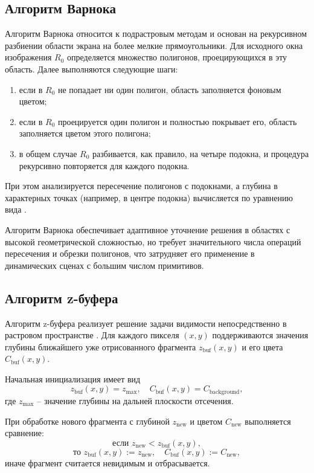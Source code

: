 \subsection{Алгоритм Варнока}

Алгоритм Варнока относится к подрастровым методам и основан на рекурсивном разбиении области экрана на более мелкие прямоугольники.\cite{FoleyVanDam} Для исходного окна изображения $R_{0}$ определяется множество полигонов, проецирующихся в эту область. Далее выполняются следующие шаги:
\begin{enumerate}
	\item если в $R_{0}$ не попадает ни один полигон, область заполняется фоновым цветом;
	\item если в $R_{0}$ проецируется один полигон и полностью покрывает его, область заполняется цветом этого полигона;
	\item в общем случае $R_{0}$ разбивается, как правило, на четыре подокна, и процедура рекурсивно повторяется для каждого подокна.
\end{enumerate}

При этом анализируется пересечение полигонов с подокнами, а глубина в характерных точках (например, в центре подокна) вычисляется по уравнению вида \cite{RogersAdams}.

Алгоритм Варнока обеспечивает адаптивное уточнение решения в областях с высокой геометрической сложностью, но требует значительного числа операций пересечения и обрезки полигонов, что затрудняет его применение в динамических сценах с большим числом примитивов.

\subsection{Алгоритм z-буфера}

Алгоритм z-буфера реализует решение задачи видимости непосредственно в растровом пространстве \cite{RogersAdams}. Для каждого пикселя $(x, y)$ поддерживаются значения глубины ближайшего уже отрисованного фрагмента $z_{\text{buf}}(x, y)$ и его цвета $C_{\text{buf}}(x, y)$.

Начальная инициализация имеет вид
\begin{equation}
	z_{\text{buf}}(x, y) = z_{\max}, \quad
	C_{\text{buf}}(x, y) = C_{\text{background}},
\end{equation}
где $z_{\max}$ -- значение глубины на дальней плоскости отсечения.

При обработке нового фрагмента с глубиной $z_{\text{new}}$ и цветом $C_{\text{new}}$ выполняется сравнение:
\begin{equation}
	\text{если } z_{\text{new}} < z_{\text{buf}}(x, y),
\end{equation}
\begin{equation}
	\text{то } z_{\text{buf}}(x, y) := z_{\text{new}}, \quad
	C_{\text{buf}}(x, y) := C_{\text{new}},
\end{equation}
иначе фрагмент считается невидимым и отбрасывается.

